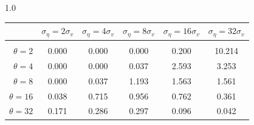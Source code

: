 \documentclass[12pt]{article}
\begin{document}
\begin{table}[h!]
\begin{subtable}{1.0\textwidth}
    \centering
\begin{tabular}{rccccc}
\hline  
            & \multicolumn{1}{l}{$\sigma_{\eta} =2\sigma_{v}$} & \multicolumn{1}{l}{$\sigma_{\eta} =4\sigma_{v}$} & \multicolumn{1}{l}{$\sigma_{\eta} =8\sigma_{v}$} & \multicolumn{1}{l}{$\sigma_{\eta} =16\sigma_{v}$} & \multicolumn{1}{l}{$\sigma_{\eta} =32\sigma_{v}$} \\ \hline  \vspace{-3mm} \\        
$\theta=2$  & 0.000                                             & 0.000                                             & 0.000                                             & 0.200                                              & 10.214                                             \\ \hline
$\theta=4$  & 0.000                                             & 0.000                                             & 0.037                                             & 2.593                                              & 3.253                                              \\ \hline
$\theta=8$  & 0.000                                             & 0.037                                             & 1.193                                             & 1.563                                              & 1.561                                              \\ \hline
$\theta=16$ & 0.038                                             & 0.715                                             & 0.956                                             & 0.762                                              & 0.361                                              \\ \hline
$\theta=32$ & 0.171                                             & 0.286                                             & 0.297                                             & 0.096                                              & 0.042                                              \\ \hline
\end{tabular}
\end{subtable}


\end{table}
\end{document}
